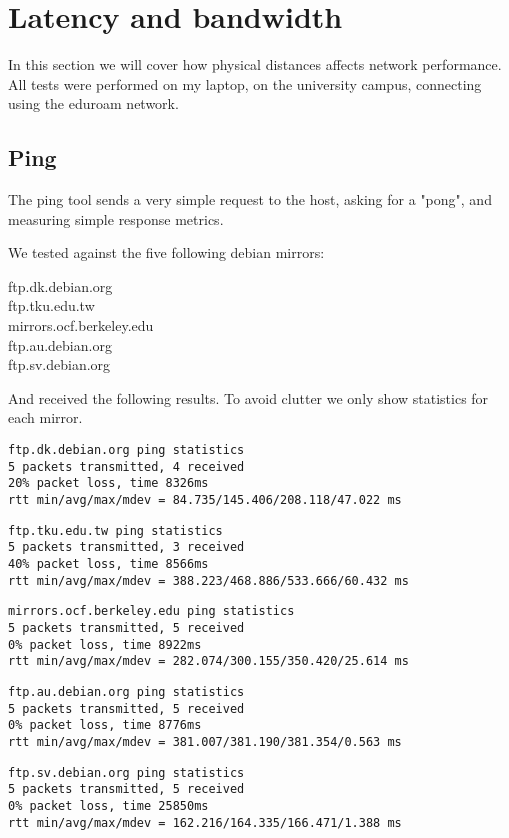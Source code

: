 \documentclass{acm_proc_article-sp}
\begin{document}

\section{Latency and bandwidth}
In this section we will cover how physical distances affects network performance.
All tests were performed on my laptop, on the university campus, connecting using the eduroam network.

\subsection{Ping}
The ping tool sends a very simple request to the host, asking for a "pong", and measuring simple response metrics.

We tested against the five following debian mirrors:

ftp.dk.debian.org\\
ftp.tku.edu.tw\\
mirrors.ocf.berkeley.edu\\
ftp.au.debian.org\\
ftp.sv.debian.org
 
And received the following results. To avoid clutter we only show statistics for each mirror.

\begin{lstlisting}
ftp.dk.debian.org ping statistics
5 packets transmitted, 4 received
20% packet loss, time 8326ms
rtt min/avg/max/mdev = 84.735/145.406/208.118/47.022 ms
\end{lstlisting}
\begin{lstlisting}     
ftp.tku.edu.tw ping statistics
5 packets transmitted, 3 received
40% packet loss, time 8566ms
rtt min/avg/max/mdev = 388.223/468.886/533.666/60.432 ms
\end{lstlisting}
\begin{lstlisting}
mirrors.ocf.berkeley.edu ping statistics
5 packets transmitted, 5 received
0% packet loss, time 8922ms
rtt min/avg/max/mdev = 282.074/300.155/350.420/25.614 ms
\end{lstlisting}
\begin{lstlisting}
ftp.au.debian.org ping statistics
5 packets transmitted, 5 received
0% packet loss, time 8776ms
rtt min/avg/max/mdev = 381.007/381.190/381.354/0.563 ms
\end{lstlisting}
\begin{lstlisting}
ftp.sv.debian.org ping statistics
5 packets transmitted, 5 received
0% packet loss, time 25850ms
rtt min/avg/max/mdev = 162.216/164.335/166.471/1.388 ms
\end{lstlisting}
\end{document}
